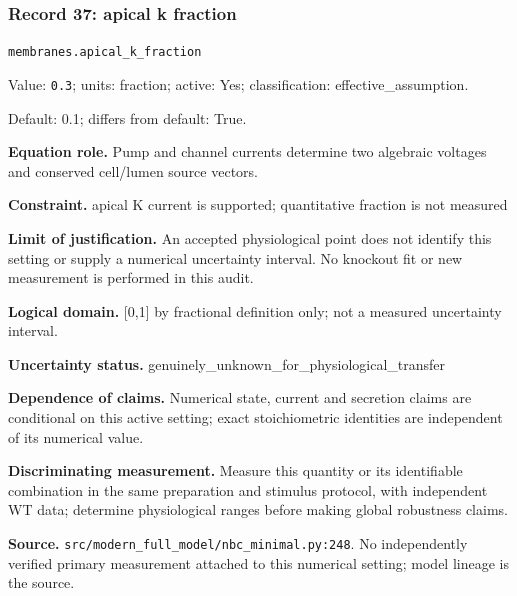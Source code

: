 \subsubsection*{Record 37: apical k fraction}
{\small \nolinkurl{membranes.apical_k_fraction}\par

Value: \texttt{0.3}; units: fraction; active: Yes; classification: effective\_assumption.\par

Default: 0.1; differs from default: True.\par

\textbf{Equation role.} Pump and channel currents determine two algebraic voltages and conserved cell/lumen source vectors.\par

\textbf{Constraint.} apical K current is supported; quantitative fraction is not measured\par

\textbf{Limit of justification.} An accepted physiological point does not identify this setting or supply a numerical uncertainty interval. No knockout fit or new measurement is performed in this audit.\par

\textbf{Logical domain.} [0,1] by fractional definition only; not a measured uncertainty interval.\par

\textbf{Uncertainty status.} genuinely\_unknown\_for\_physiological\_transfer\par

\textbf{Dependence of claims.} Numerical state, current and secretion claims are conditional on this active setting; exact stoichiometric identities are independent of its numerical value.\par

\textbf{Discriminating measurement.} Measure this quantity or its identifiable combination in the same preparation and stimulus protocol, with independent WT data; determine physiological ranges before making global robustness claims.\par

\textbf{Source.} \nolinkurl{src/modern_full_model/nbc_minimal.py:248}. No independently verified primary measurement attached to this numerical setting; model lineage is the source.\par}

